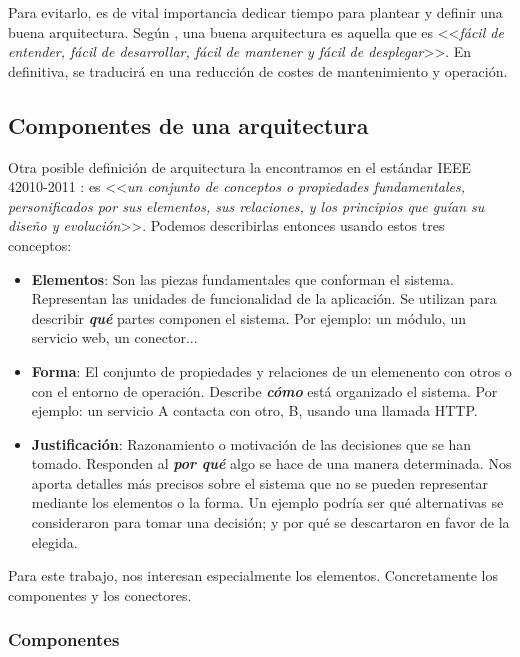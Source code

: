 Para evitarlo, es de vital importancia dedicar tiempo para plantear y definir una buena arquitectura. Según \cite{martinChapter15What2018}, una buena arquitectura es aquella que es <<\emph{fácil de entender, fácil de desarrollar, fácil de mantener y fácil de desplegar}>>. En definitiva, se traducirá en una reducción de costes de mantenimiento y operación.

\subsection{Componentes de una arquitectura}

Otra posible definición de arquitectura la encontramos en el estándar IEEE 42010-2011 \cite{ieeeStandard420102011Systems2011}: es <<\emph{un conjunto de conceptos o propiedades fundamentales, personificados por sus elementos, sus relaciones, y los principios que guían su diseño y evolución}>>. Podemos describirlas entonces usando estos tres conceptos: \cite{perryFoundationsStudySoftware1992}

    \begin{itemize}
        \item \textbf{Elementos}: Son las piezas fundamentales que conforman el sistema. Representan las unidades de funcionalidad de la aplicación. Se utilizan para describir \textbf{\emph{qué}} partes componen el sistema. Por ejemplo: un módulo, un servicio web, un conector...

        \item \textbf{Forma}: El conjunto de propiedades y relaciones de un elemenento con otros o con el entorno de operación. Describe \textbf{\emph{cómo}} está organizado el sistema. Por ejemplo: un servicio A contacta con otro, B, usando una llamada HTTP.

        \item \textbf{Justificación}: Razonamiento o motivación de las decisiones que se han tomado. Responden al \textbf{\emph{por qué}} algo se hace de una manera determinada. Nos aporta detalles más precisos sobre el sistema que no se pueden representar mediante los elementos o la forma. Un ejemplo podría ser qué alternativas se consideraron para tomar una decisión; y por qué se descartaron en favor de la elegida.

    \end{itemize}

Para este trabajo, nos interesan especialmente los elementos. Concretamente los componentes y los conectores.

\subsubsection{Componentes}

